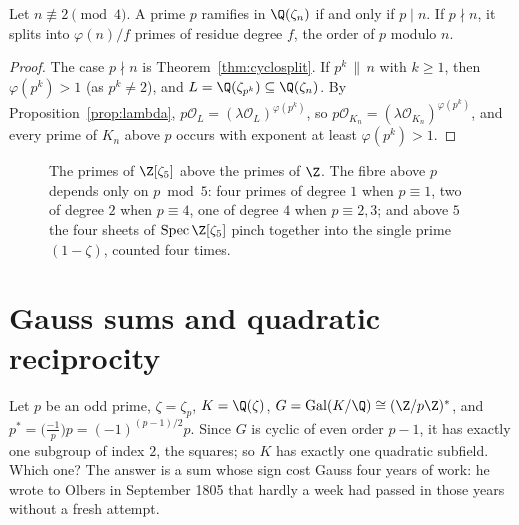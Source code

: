 \begin{corollary}\label{cor:cycloram}
Let $n\not\equiv2\pmod4$. A prime $p$ ramifies in $\Q(\zeta_n)$ if and only if $p\mid n$. If $p\nmid n$, it splits into
$\varphi(n)/f$ primes of residue degree $f$, the order of $p$ modulo $n$.
\end{corollary}
\begin{proof}
The case $p\nmid n$ is Theorem~\ref{thm:cyclosplit}. If $p^k\,\|\,n$ with $k\ge1$, then $\varphi(p^k)>1$ (as $p^k\ne2$), and
$L=\Q(\zeta_{p^k})\subseteq\Q(\zeta_n)$. By Proposition~\ref{prop:lambda}, $p\mathcal O_L=(\lambda\mathcal O_L)^{\varphi(p^k)}$, so
$p\mathcal O_{K_n}=(\lambda\mathcal O_{K_n})^{\varphi(p^k)}$, and every prime of $K_n$ above $p$ occurs with exponent at least
$\varphi(p^k)>1$.
\end{proof}

\begin{figure}[ht]
\centering
{}
\caption{The primes of $\Z[\zeta_5]$ above the primes of $\Z$. The fibre above $p$ depends only on $p\bmod 5$: four primes
of degree $1$ when $p\equiv1$, two of degree $2$ when $p\equiv4$, one of degree $4$ when $p\equiv2,3$; and above $5$ the
four sheets of $\operatorname{Spec}\Z[\zeta_5]$ pinch together into the single prime $(1-\zeta)$, counted four times.}
\label{fig:spec5}
\end{figure}

\section{Gauss sums and quadratic reciprocity}

Let $p$ be an odd prime, $\zeta=\zeta_p$, $K=\Q(\zeta)$, $G=\operatorname{Gal}(K/\Q)\cong(\Z/p\Z)^*$, and
$p^*=\bigl(\frac{-1}p\bigr)p=(-1)^{(p-1)/2}p$. Since $G$ is cyclic of even order $p-1$, it has exactly one subgroup of index
$2$, the squares; so $K$ has exactly one quadratic subfield. Which one? The answer is a sum whose sign cost Gauss four years of work: he wrote to Olbers in September 1805 that hardly a week had
passed in those years without a fresh attempt.

